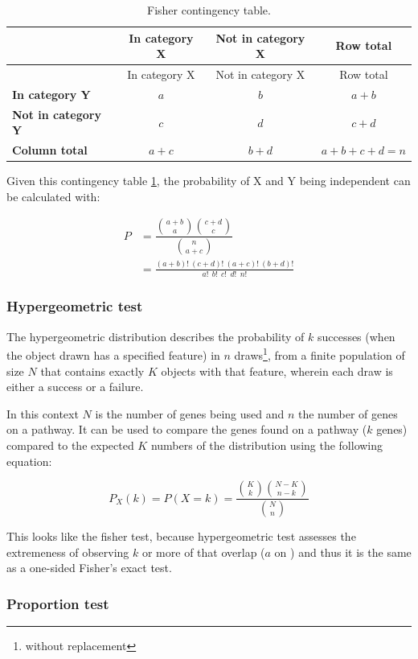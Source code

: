 \documentclass[
  12pt,
  a4paper,
  twoside,
  openright]{book}
\begin{document}
\begin{longtable}[]{@{}lccc@{}}
\caption{\label{tab:fisher} Fisher contingency table.}\tabularnewline
\toprule
& In category X & Not in category X & Row total \\
\midrule
\endfirsthead
\toprule
& In category X & Not in category X & Row total \\
\midrule
\endhead
\textbf{In category Y} & \(a\) & \(b\) & \(a+b\) \\
\textbf{Not in category Y} & \(c\) & \(d\) & \(c+d\) \\
\textbf{Column total} & \(a+c\) & \(b+d\) & \(a+b+c+d = n\) \\
\bottomrule
\end{longtable}

Given this contingency table \ref{tab:fisher}, the probability of X and Y being independent can be calculated with:

\[
\begin{aligned}
P & = \dfrac{ \binom{a+b}{a} \binom{c+d}{c} }{\binom{n}{a+c}} \\
& = \frac{(a+b)!~(c+d)!~(a+c)!~(b+d)!}{a!~~b!~~c!~~d!~~n!}
\end{aligned}
\]

\hypertarget{hypergeometric-test}{%
\subsubsection{Hypergeometric test}\label{hypergeometric-test}}

The hypergeometric distribution describes the probability of \(k\) successes (when the object drawn has a specified feature) in \(n\) draws\footnote{without replacement}, from a finite population of size \(N\) that contains exactly \(K\) objects with that feature, wherein each draw is either a success or a failure.

In this context \(N\) is the number of genes being used and \(n\) the number of genes on a pathway.
It can be used to compare the genes found on a pathway (\(k\) genes) compared to the expected \(K\) numbers of the distribution using the following equation:

\[
P_X(k) = P(X = k) 
= \frac{\binom{K}{k} \binom{N - K}{n-k}}{\binom{N}{n}}
\]

This looks like the fisher test, because hypergeometric test assesses the extremeness of observing \(k\) or more of that overlap (\(a\) on ) and thus it is the same as a one-sided Fisher's exact test.

\hypertarget{proportion-test}{%
\subsubsection{Proportion test}\label{proportion-test}}
\end{document}
